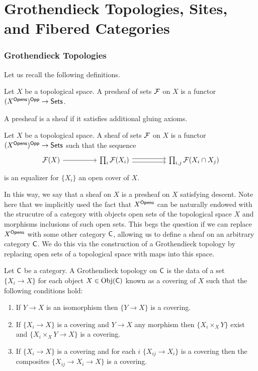 \part*{Grothendieck Topologies, Sites, and Fibered Categories}
\section{Grothendieck Topologies}
Let us recall the following definitions. 
\begin{definition}[Presheaf]\label{def: presheaf on topological space}
    Let $X$ be a topological space. A presheaf of sets $\mathcal{F}$ on $X$ is a functor $(X^{\mathsf{Opens}})^{\mathsf{Opp}}\to\mathsf{Sets}$. 
\end{definition}
A presheaf is a sheaf if it satisfies additional gluing axioms. 
\begin{definition}[Sheaf]\label{def: topological sheaf}
    Let $X$ be a topological space. A sheaf of sets $\mathcal{F}$ on $X$ is a functor $(X^{\mathsf{Opens}})^{\mathsf{Opp}}\to\mathsf{Sets}$ such that the sequence 
    $$%
    \begin{tikzcd}
        {\Fcal(X)} && {\prod_{i}\Fcal(X_{i})} && {\prod_{i,j}\Fcal(X_{i}\cap X_{j})}
        \arrow[from=1-1, to=1-3]
        \arrow[shift left, from=1-3, to=1-5]
        \arrow[shift right, from=1-3, to=1-5]
    \end{tikzcd}$$
    is an equalizer for $\{X_{i}\}$ an open cover of $X$.  
\end{definition}
In this way, we say that a sheaf on $X$ is a presheaf on $X$ satisfying descent. Note here that we implicitly used the fact that $X^{\mathsf{Opens}}$ can be naturally endowed with the strucutre of a category with objects open sets of the topological space $X$ and morphisms inclusions of such open sets. This begs the question if we can replace $X^{\mathsf{Opens}}$ with some other category $\mathsf{C}$, allowing us to define a sheaf on an arbitrary category $\mathsf{C}$. We do this via the construction of a Grothendieck topology by replacing open sets of a topological space with maps into this space. 
\begin{definition}\label{def: Grothendieck topology}
    Let $\mathsf{C}$ be a category. A Grothendieck topology on $\mathsf{C}$ is the data of a set $\{X_{i}\to X\}$ for each object $X\in\mathrm{Obj}(\mathsf{C})$ known as a covering of $X$ such that the following conditions hold:
    \begin{enumerate}[label=(\alph*)]
        \item If $Y\to X$ is an isomorphism then $\{Y\to X\}$ is a covering.  
        \item If $\{X_{i}\to X\}$ is a covering and $Y\to X$ any morphism then $\{X_{i}\times_{X}Y\}$ exist and $\{X_{i}\times_{X}Y\to X\}$ is a covering. 
        \item If $\{X_{i}\to X\}$ is a covering and for each $i$ $\{X_{ij}\to X_{i}\}$ is a covering then the composites $\{X_{ij}\to X_{i}\to X\}$ is a covering. 
    \end{enumerate}
\end{definition}
